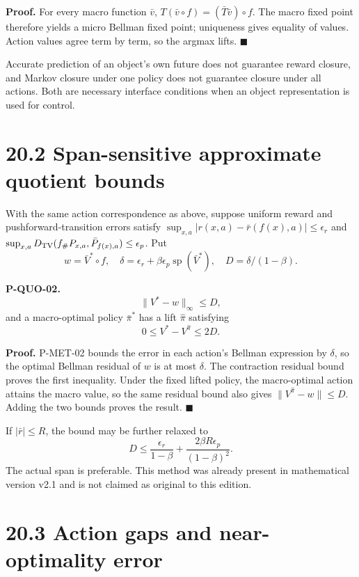 \documentclass[
  english,
  11pt,
  oneside]{book}
\begin{document}
\textbf{Proof.} For every macro function \(\bar v\), \(T(\bar v\circ f)=(\bar T\bar v)\circ f\). The macro fixed point therefore yields a micro Bellman fixed point; uniqueness gives equality of values. Action values agree term by term, so the argmax lifts. \(\blacksquare\)

Accurate prediction of an object's own future does not guarantee reward closure, and Markov closure under one policy does not guarantee closure under all actions. Both are necessary interface conditions when an object representation is used for control.

\section{20.2 Span-sensitive approximate quotient bounds}\label{span-sensitive-approximate-quotient-bounds}

With the same action correspondence as above, suppose uniform reward and pushforward-transition errors satisfy \(\sup_{x,a}|r(x,a)-\bar r(f(x),a)|\le\epsilon_r\) and \(\sup_{x,a}D_{\rm TV}(f_\#P_{x,a},\bar P_{f(x),a})\le\epsilon_p\). Put \[w=\bar V^*\circ f,\quad
\delta=\epsilon_r+\beta\epsilon_p\operatorname{sp}(\bar V^*),\quad
D=\delta/(1-\beta).\]

\hypertarget{p-quo-02}{}\label{p-quo-02}

\textbf{P-QUO-02.} \[\|V^*-w\|_\infty\le D,\] and a macro-optimal policy \(\bar\pi^*\) has a lift \(\widehat\pi\) satisfying \[0\le V^*-V^{\widehat\pi}\le2D.\]

\textbf{Proof.} P-MET-02 bounds the error in each action's Bellman expression by \(\delta\), so the optimal Bellman residual of \(w\) is at most \(\delta\). The contraction residual bound proves the first inequality. Under the fixed lifted policy, the macro-optimal action attains the macro value, so the same residual bound also gives \(\|V^{\widehat\pi}-w\|\le D\). Adding the two bounds proves the result. \(\blacksquare\)

If \(|\bar r|\le R\), the bound may be further relaxed to \[D\le\frac{\epsilon_r}{1-\beta}
+\frac{2\beta R\epsilon_p}{(1-\beta)^2}.\] The actual span is preferable. This method was already present in mathematical version v2.1 and is not claimed as original to this edition.

\section{20.3 Action gaps and near-optimality error}\label{action-gaps-and-near-optimality-error}
\end{document}
